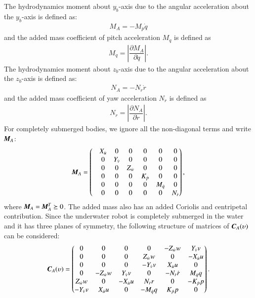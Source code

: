 The hydrodynamics moment about $y_{b}$-axis due to the angular acceleration about the $y_{b}$-axis is defined as:
\begin{align}
M_{A}=-M_{\dot{p}}\dot{q}
\end{align}
and the added mass coefficient of pitch acceleration $M_{\dot{q}}$ is defined as
\begin{align}
M_{\dot{q}}=\left|\dfrac{\partial M_{A}}{\partial \dot{q}}\right|.
\end{align}
The hydrodynamics moment about $z_{b}$-axis due to the angular acceleration about the $z_{b}$-axis is defined as:
\begin{align}
N_{A}=-N_{\dot{r}}\dot{r}
\end{align}
and the added mass coefficient of yaw acceleration $N_{\dot{r}}$ is defined as
\begin{align}
N_{\dot{r}}=\left|\dfrac{\partial N_{A}}{\partial \dot{r}}\right|.
\end{align}
For completely submerged bodies, we ignore all the non-diagonal terms and write $\emph{\textbf{M}}_{A}$: 
\begin{align}
\emph{\textbf{M}}_{A}=
\begin{pmatrix}
&X_{\dot{u}}&0&0&0&0&0\\
&0&Y_{\dot{v}}&0&0&0&0\\
&0&0&Z_{\dot{w}}&0&0&0\\
&0&0&0&K_{\dot{p}}&0&0\\
&0&0&0&0&M_{\dot{q}}&0\\
&0&0&0&0&0&N_{\dot{r}}
\end{pmatrix},\label{EQ:AddedMassMatrix2}
\end{align}
where $\emph{\textbf{M}}_{A}=\emph{\textbf{M}}_{A}^{T} \succeq 0$.
The added mass also has an added Coriolis and centripetal contribution. Since the underwater robot is completely submerged in the water and it has three planes of symmetry, the following structure of matrices of $\emph{\textbf{C}}_{A}(\upsilon)$ can be considered: 
\begin{align}
\emph{\textbf{C}}_{A}(\upsilon)=
\begin{pmatrix}
0&0&0&0&-Z_{\dot{w}}w&Y_{\dot{v}}v\\
0&0&0&Z_{\dot{w}}w&0&-X_{\dot{u}}u\\
0&0&0&-Y_{\dot{v}}v&X_{\dot{u}}u&0\\
0&-Z_{\dot{w}}w&Y_{\dot{v}}v&0&-N_{\dot{r}}\dot{r}&M_{\dot{q}}q\\
Z_{\dot{w}}w&0&-X_{\dot{u}}u&N_{\dot{r}}r&0&-K_{\dot{p}}p\\
-Y_{\dot{v}}v&X_{\dot{u}}u&0&-M_{\dot{q}}q&K_{\dot{p}}p&0
\end{pmatrix}. \label{EQ:CoriolisMatrix2}
\end{align}
